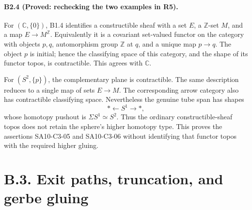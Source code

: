\paragraph{B2.4 (Proved: rechecking the two examples in R5).}
For $(\mathbb C,\{0\})$, B1.4 identifies a constructible sheaf with a
set $E$, a $\mathbb Z$-set $M$, and a map $E\to M^{\mathbb Z}$.
Equivalently it is a covariant set-valued functor on the category with
objects $p,q$, automorphism group $\mathbb Z$ at $q$, and a unique map
$p\to q$. The object $p$ is initial; hence the classifying space of
this category, and the shape of its functor topos, is contractible.
This agrees with $\mathbb C$.

For $(S^2,\{p\})$, the complementary plane is contractible. The same
description reduces to a single map of sets $E\to M$. The corresponding
arrow category also has contractible classifying space. Nevertheless
the genuine tube span has shapes
\[
 *\longleftarrow S^1\longrightarrow *,
\]
whose homotopy pushout is $\Sigma S^1\simeq S^2$. Thus the ordinary
constructible-sheaf topos does not retain the sphere's higher homotopy
type. This proves the assertions SA10-C3-05 and SA10-C3-06 without
identifying that functor topos with the required higher gluing.

\section{B.3. Exit paths, truncation, and gerbe gluing}

